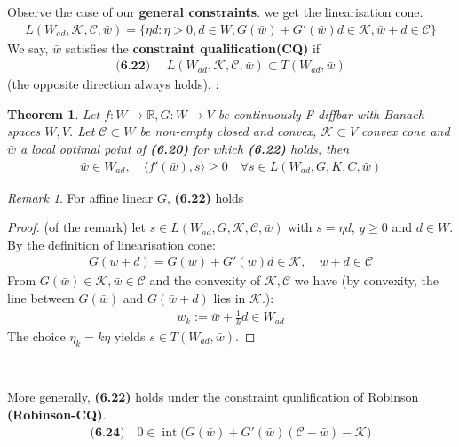 \documentclass[a4paper,11pt,fleqn]{book}
\newtheorem{theorem}{Theorem}[section]
\theoremstyle{definition}
\theoremstyle{remark}
\newtheorem*{remark}{Remark}
\DeclareMathOperator*{\interior}{int}
\begin{document}
Observe the case of our \textbf{general constraints}. we get the linearisation cone. 
\begin{align*}
	L(W_{ad}, \mathcal{K}, \mathcal{C}, \bar{w}) = \{\eta d: \eta > 0, d \in W, G(\bar{w}) + G'(\bar{w}) d \in \mathcal{K} ,  \bar{w} + d \in \mathcal{C}\}
\end{align*}
We say, $\bar{w}$ satisfies the \textbf{constraint qualification(CQ)} if 
\begin{align*}
\textbf{(6.22) }\quad
	L(W_{ad}, \mathcal{K}, \mathcal{C}, \bar{w}) \subset T(W_{ad}, \bar{w})
\end{align*} 
(the opposite direction always holds). :
\begin{theorem}
	Let $f : W \rightarrow \mathbb{R}, G: W \rightarrow V$ be continuously F-diffbar with Banach spaces $W, V$. Let $\mathcal{C} \subset W$ be non-empty closed and convex, $\mathcal{K} \subset V$ convex cone and $\bar{w}$ a local optimal point of \textbf{(6.20) } for which \textbf{(6.22)} holds, then
	\begin{align*}
		\bar{w} \in W_{ad}, \quad  \langle f'(\bar{w}), s \rangle \geq 0 \quad \forall s \in L(W_{ad}, G, K, C, \bar{w})
	\end{align*}
\end{theorem}
\begin{remark}
For affine linear $G$, \textbf{(6.22)} holds
\begin{proof}(of the remark) 
	let $s \in L(W_{ad}, G, \mathcal{K}, \mathcal{C}, \bar{w})$ with $s = \eta d$, $y \geq 0$ and $d \in W$. By the definition of linearisation cone: 
	\begin{align*}
		G(\bar{w} + d) = G(\bar{w}) + G'(\bar{w})d \in \mathcal{K} , 
		\quad \bar{w} + d \in \mathcal{C}
	\end{align*}
	From $G(\bar{w}) \in \mathcal{K}, \bar{w} \in \mathcal{C}$ and the convexity of $\mathcal{K}, \mathcal{C}$ we have (by convexity, the line between $G(\bar{w})$ and $G(\bar{w} + d)$ lies in $\mathcal{K}$.):
	\begin{align*}
		w_k:= \bar{w} + \frac{1}{k} d \in W_{ad}
	\end{align*}
	The choice $\eta_k = k \eta $ yields $s \in T(W_{ad}, \bar{w})$. 
\end{proof}	
\end{remark}

\quad\\
\quad\par
More generally, \textbf{(6.22)} holds under the constraint qualification of Robinson \textbf{(Robinson-CQ)}. 
\begin{align*}
\textbf{(6.24)}\quad
	0 \in \interior \bigg(G(\bar{w}) + G'(\bar{w})(\mathcal{C} - \bar{w}) - \mathcal{K}\bigg)
\end{align*}
\end{document}
